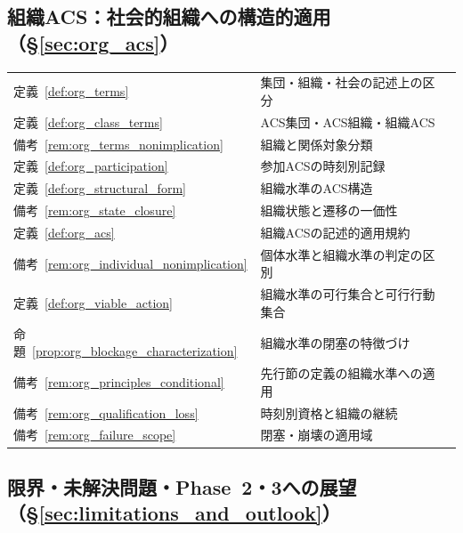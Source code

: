 \subsection*{組織ACS：社会的組織への構造的適用（\S\ref{sec:org_acs}）}

\begingroup
\small
\setlength{\tabcolsep}{4pt}
\renewcommand{\arraystretch}{1.12}
\begin{longtable}{p{2.4cm} p{10.4cm} r}
定義~\ref{def:org_terms} & 集団・組織・社会の記述上の区分 & \pageref{def:org_terms} \\
定義~\ref{def:org_class_terms} & ACS集団・ACS組織・組織ACS & \pageref{def:org_class_terms} \\
備考~\ref{rem:org_terms_nonimplication} & 組織と関係対象分類 & \pageref{rem:org_terms_nonimplication} \\
定義~\ref{def:org_participation} & 参加ACSの時刻別記録 & \pageref{def:org_participation} \\
定義~\ref{def:org_structural_form} & 組織水準のACS構造 & \pageref{def:org_structural_form} \\
備考~\ref{rem:org_state_closure} & 組織状態と遷移の一価性 & \pageref{rem:org_state_closure} \\
定義~\ref{def:org_acs} & 組織ACSの記述的適用規約 & \pageref{def:org_acs} \\
備考~\ref{rem:org_individual_nonimplication} & 個体水準と組織水準の判定の区別 & \pageref{rem:org_individual_nonimplication} \\
定義~\ref{def:org_viable_action} & 組織水準の可行集合と可行行動集合 & \pageref{def:org_viable_action} \\
命題~\ref{prop:org_blockage_characterization} & 組織水準の閉塞の特徴づけ & \pageref{prop:org_blockage_characterization} \\
備考~\ref{rem:org_principles_conditional} & 先行節の定義の組織水準への適用 & \pageref{rem:org_principles_conditional} \\
備考~\ref{rem:org_qualification_loss} & 時刻別資格と組織の継続 & \pageref{rem:org_qualification_loss} \\
備考~\ref{rem:org_failure_scope} & 閉塞・崩壊の適用域 & \pageref{rem:org_failure_scope} \\
\end{longtable}
\endgroup

\subsection*{限界・未解決問題・Phase~2・3への展望（\S\ref{sec:limitations_and_outlook}）}

